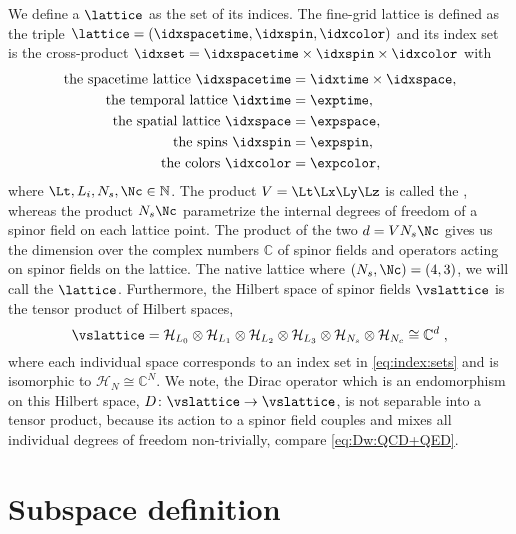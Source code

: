 We define a  $\lattice$ as the set of its indices.
The fine-grid lattice is defined as the triple $\lattice = (\idxspacetime, \idxspin, \idxcolor)$ and its index set is the cross-product $\idxset = \idxspacetime \times \idxspin \times \idxcolor$ with
\begin{align}
\begin{aligned}
\text{the spacetime lattice }
    \idxspacetime &= \idxtime \times \idxspace, \\
\text{the temporal lattice }
    \idxtime  &= \exptime, \\
\text{the spatial lattice }
    \idxspace &= \expspace, \\
\text{the spins }
    \idxspin  &= \expspin, \\
\text{the colors }
    \idxcolor &= \expcolor,
\end{aligned} \label{eq:index:sets}
\end{align}
where $\Lt,L_i,N_s,\Nc \in \mathbb{N}$.
The product $V = \Lt \Lx \Ly \Lz$ is called the , whereas the product $N_s \Nc$ parametrize the internal degrees of freedom of a spinor field on each lattice point.
The product of the two $d = V N_s \Nc$ gives us the dimension over the complex numbers $\mathbb{C}$ of spinor fields and operators acting on spinor fields on the lattice.
The native lattice where $(N_s, \Nc) = (4,3)$, we will call the  $\lattice$.
Furthermore, the Hilbert space of spinor fields $\vslattice$ is the tensor product of Hilbert spaces,
\begin{equation}
\vslattice = \mathcal{H}_{L_0} \otimes \mathcal{H}_{L_1} \otimes \mathcal{H}_{L_2} \otimes \mathcal{H}_{L_3} \otimes \mathcal{H}_{N_s} \otimes \mathcal{H}_{N_c} \cong \mathbb{C}^{d} \;,
\end{equation}
where each individual space corresponds to an index set in \cref{eq:index:sets} and is isomorphic to $\mathcal{H}_{N} \cong \mathbb{C}^{N}$.
We note, the Dirac operator which is an endomorphism on this Hilbert space, $D \colon \vslattice \rightarrow \vslattice$, is not separable into a tensor product, because its action to a spinor field couples and mixes all individual degrees of freedom non-trivially, compare \cref{eq:Dw:QCD+QED}.

\section{Subspace definition}

